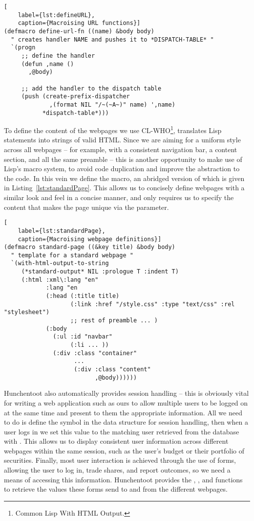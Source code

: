 \begin{lstlisting}[
	label={lst:defineURL},
	caption={Macroising URL functions}]
(defmacro define-url-fn ((name) &body body)
  " creates handler NAME and pushes it to *DISPATCH-TABLE* "
  `(progn
     ;; define the handler
     (defun ,name ()
       ,@body)

     ;; add the handler to the dispatch table
     (push (create-prefix-dispatcher
             ,(format NIL "/~(~A~)" name) ',name)
           *dispatch-table*)))
\end{lstlisting}

To define the content of the webpages we use CL-WHO\footnote{Common Lisp With
HTML Output.}, translates Lisp statements into strings of valid HTML. Since we
are aiming for a uniform style across all webpages -- for example, with a
consistent navigation bar, a content section, and all the same preamble -- this
is another opportunity to make use of Lisp's macro system, to avoid code
duplication and improve the abstraction to the code. In this vein we define the
 macro, an abridged version of which is given in
Listing~\ref{lst:standardPage}. This allows us to concisely define webpages
with a similar look and feel in a concise manner, and only requires us to
specify the content that makes the page unique via the  parameter.

\begin{lstlisting}[
	label={lst:standardPage},
	caption={Macroising webpage definitions}]
(defmacro standard-page ((&key title) &body body)
  " template for a standard webpage "
  `(with-html-output-to-string
     (*standard-output* NIL :prologue T :indent T)
     (:html :xml\:lang "en"
            :lang "en
            (:head (:title title)
                   (:link :href "/style.css" :type "text/css" :rel "stylesheet")
                   ;; rest of preamble ... )
            (:body
              (:ul :id "navbar"
                   (:li ... ))
              (:div :class "container"
                    ...
                    (:div :class "content"
                          ,@body))))))
\end{lstlisting}

Hunchentoot also automatically provides session handling -- this is obviously
vital for writing a web application such as ours to allow multiple users to be
logged on at the same time and present to them the appropriate information.
All we need to do is define the symbol  in the data
structure for session handling, then when a user logs in we set this value to
the matching user retrieved from the database with . This allows us to display consistent user information across
different webpages within the same session, such as the user's budget or their
portfolio of securities. Finally, most user interaction is achieved through the
use of forms, allowing the user to log in, trade shares, and report outcomes,
so we need a means of accessing this information. Hunchentoot provides the
, , and  functions to
retrieve the values these forms send to and from the different webpages.

